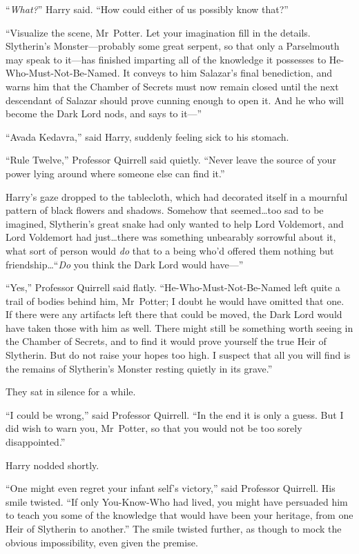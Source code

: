 “\emph{What?}” Harry said. “How could either of us possibly know that?”

“Visualize the scene, Mr~Potter. Let your imagination fill in the details. Slytherin’s Monster—probably some great serpent, so that only a Parselmouth may speak to it—has finished imparting all of the knowledge it possesses to He-Who-Must-Not-Be-Named. It conveys to him Salazar’s final benediction, and warns him that the Chamber of Secrets must now remain closed until the next descendant of Salazar should prove cunning enough to open it. And he who will become the Dark Lord nods, and says to it—”

“Avada Kedavra,” said Harry, suddenly feeling sick to his stomach.

“Rule Twelve,” Professor Quirrell said quietly. “Never leave the source of your power lying around where someone else can find it.”

Harry’s gaze dropped to the tablecloth, which had decorated itself in a mournful pattern of black flowers and shadows. Somehow that seemed…too sad to be imagined, Slytherin’s great snake had only wanted to help Lord Voldemort, and Lord Voldemort had just…there was something unbearably sorrowful about it, what sort of person would \emph{do} that to a being who’d offered them nothing but friendship…“\emph{Do} you think the Dark Lord would have—”

“Yes,” Professor Quirrell said flatly. “He-Who-Must-Not-Be-Named left quite a trail of bodies behind him, Mr~Potter; I doubt he would have omitted that one. If there were any artifacts left there that could be moved, the Dark Lord would have taken those with him as well. There might still be something worth seeing in the Chamber of Secrets, and to find it would prove yourself the true Heir of Slytherin. But do not raise your hopes too high. I suspect that all you will find is the remains of Slytherin’s Monster resting quietly in its grave.”

They sat in silence for a while.

“I could be wrong,” said Professor Quirrell. “In the end it is only a guess. But I did wish to warn you, Mr~Potter, so that you would not be too sorely disappointed.”

Harry nodded shortly.

“One might even regret your infant self’s victory,” said Professor Quirrell. His smile twisted. “If only You-Know-Who had lived, you might have persuaded him to teach you some of the knowledge that would have been your heritage, from one Heir of Slytherin to another.” The smile twisted further, as though to mock the obvious impossibility, even given the premise.


